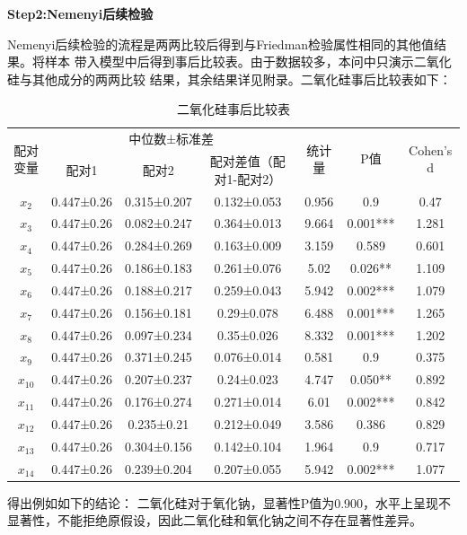 \documentclass[UTF8]{ctexart}
\begin{document}
\textbf{Step2:Nemenyi后续检验}

Nemenyi后续检验的流程是两两比较后得到与Friedman检验属性相同的其他值结果。将样本
带入模型中后得到事后比较表。由于数据较多，本问中只演示二氧化硅与其他成分的两两比较
结果，其余结果详见附录。二氧化硅事后比较表如下：

\begin{table}[H]
    \centering
	\caption{二氧化硅事后比较表}
    \begin{tabular}{|c|c|c|c|c|c|c|}
    \hline
	\multirow{2}{*}{配对变量} & \multicolumn{3}{|c|}{中位数±标准差} & \multirow{2}{*}{统计量} & \multirow{2}{*}{P值} & \multirow{2}{*}{Cohen's d}\\ \cline{2-4}
        ~ & 配对1 & 配对2 & 配对差值（配对1-配对2） & ~ & ~ & ~  \\ \hline
        $x_{2}$ & 0.447±0.26 & 0.315±0.207 & 0.132±0.053 & 0.956 & 0.9 & 0.47 \\ \hline
        $x_{3}$ & 0.447±0.26 & 0.082±0.247 & 0.364±0.013 & 9.664 & 0.001*** & 1.281 \\ \hline
        $x_{4}$ & 0.447±0.26 & 0.284±0.269 & 0.163±0.009 & 3.159 & 0.589 & 0.601 \\ \hline
        $x_{5}$ & 0.447±0.26 & 0.186±0.183 & 0.261±0.076 & 5.02 & 0.026** & 1.109 \\ \hline
        $x_{6}$ & 0.447±0.26 & 0.188±0.217 & 0.259±0.043 & 5.942 & 0.002*** & 1.079 \\ \hline
        $x_{7}$ & 0.447±0.26 & 0.156±0.181 & 0.29±0.078 & 6.488 & 0.001*** & 1.265 \\ \hline
        $x_{8}$ & 0.447±0.26 & 0.097±0.234 & 0.35±0.026 & 8.332 & 0.001*** & 1.202 \\ \hline
        $x_{9}$ & 0.447±0.26 & 0.371±0.245 & 0.076±0.014 & 0.581 & 0.9 & 0.375 \\ \hline
        $x_{10}$ & 0.447±0.26 & 0.207±0.237 & 0.24±0.023 & 4.747 & 0.050** & 0.892 \\ \hline
        $x_{11}$ & 0.447±0.26 & 0.176±0.274 & 0.271±0.014 & 6.01 & 0.002*** & 0.842 \\ \hline
        $x_{12}$ & 0.447±0.26 & 0.235±0.21 & 0.212±0.049 & 3.586 & 0.386 & 0.829 \\ \hline
        $x_{13}$ & 0.447±0.26 & 0.304±0.156 & 0.142±0.104 & 1.964 & 0.9 & 0.717 \\ \hline
        $x_{14}$ & 0.447±0.26 & 0.239±0.204 & 0.207±0.055 & 5.942 & 0.002*** & 1.077 \\ \hline
    \end{tabular}
\end{table}
得出例如如下的结论：
二氧化硅对于氧化钠，显著性P值为0.900，水平上呈现不显著性，不能拒绝原假设，因此二氧化硅和氧化钠之间不存在显著性差异。
\end{document}
